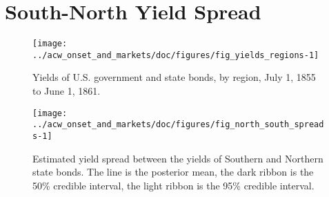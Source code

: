 \section{South-North Yield Spread}
\label{acw_onset:sec:south-north-yield}


\begin{figure}
  \centering
  \texttt{[image: ../acw\_onset\_and\_markets/doc/figures/fig\_yields\_regions-1]}
\caption{Yields of U.S. government and state bonds, by region, July  1, 1855 to June  1, 1861.}
\label{acw_onset:fig:yields_regions}
\end{figure}

\begin{figure}
  \centering
  \texttt{[image: ../acw\_onset\_and\_markets/doc/figures/fig\_north\_south\_spreads-1]}
\caption[Yield spread between Southern and Northern state bonds]{
  Estimated yield spread between the yields of Southern and Northern state bonds.
  The line is the posterior mean, the dark ribbon is the 50\% credible interval, the light ribbon is the 95\% credible interval.
}
\label{acw_onset:fig:north_south_spreads}
\end{figure}

